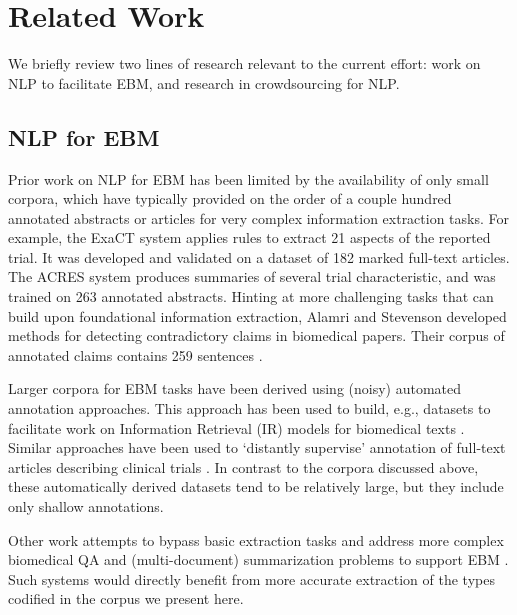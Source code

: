 \documentclass[11pt,a4paper]{article}
\begin{document}
\section{Related Work}
\label{section:related-work}

We briefly review two lines of research relevant to the current effort: work on NLP to facilitate EBM, and research in crowdsourcing for NLP. 

\subsection{NLP for EBM}
Prior work on NLP for EBM has been limited by the availability of only small corpora, which have typically provided on the order of a couple hundred annotated abstracts or articles for very complex information extraction tasks. For example, the ExaCT system \cite{kiritchenko2010exact} applies rules to extract 21 aspects of the reported trial. It was developed and validated on a dataset of 182 marked full-text articles. The ACRES system \cite{summerscales2011automatic} produces summaries of several trial characteristic, and was trained on 263 annotated abstracts.
Hinting at more challenging tasks that can build upon foundational information extraction, Alamri and Stevenson  developed methods for detecting contradictory claims in biomedical papers. Their corpus of annotated claims contains 259 sentences \cite{alamri2016corpus}.







Larger corpora for EBM tasks have been derived using (noisy) automated annotation approaches. This approach has been used to build, e.g., datasets to facilitate work on Information Retrieval (IR) models for biomedical texts 
\cite{scells2017test,chung2009sentence,boudin2010positional}. Similar approaches have been used to `distantly supervise' annotation of full-text articles describing clinical trials \cite{wallace2016extracting}. In contrast to the corpora discussed above, these automatically derived datasets tend to be relatively large, but they include only shallow annotations.









Other work attempts to bypass basic extraction tasks and address more complex biomedical QA and (multi-document) summarization problems to support EBM \cite{demner2007answering,molla2011development,abacha2015means}. Such systems would directly benefit from more accurate extraction of the types codified in the corpus we present here.
\end{document}
